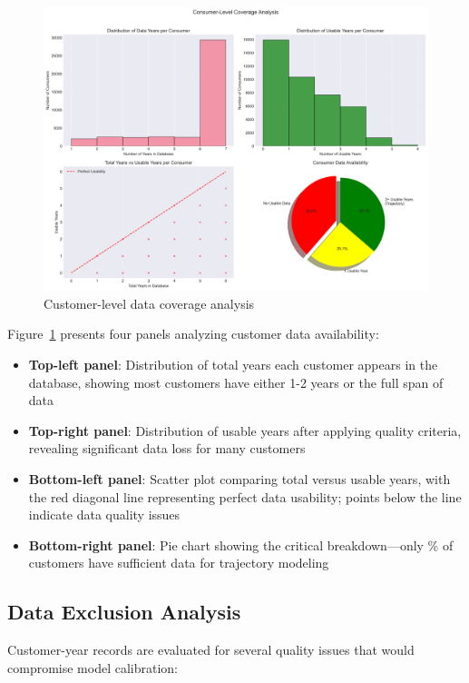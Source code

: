 \begin{figure}[h]
    \centering
    \includegraphics[width=\textwidth]{figures/consumer_coverage.png}
    \caption{Customer-level data coverage analysis}
    \label{fig:customer_coverage}
\end{figure}

Figure~\ref{fig:customer_coverage} presents four panels analyzing customer data availability:
\begin{itemize}
    \item \textbf{Top-left panel}: Distribution of total years each customer appears in the database, showing most customers have either 1-2 years or the full span of data
    \item \textbf{Top-right panel}: Distribution of usable years after applying quality criteria, revealing significant data loss for many customers
    \item \textbf{Bottom-left panel}: Scatter plot comparing total versus usable years, with the red diagonal line representing perfect data usability; points below the line indicate data quality issues
    \item \textbf{Bottom-right panel}: Pie chart showing the critical breakdown---only \CustomerPctTwoPlusYear\% of customers have sufficient data for trajectory modeling
\end{itemize}

\subsection{Data Exclusion Analysis}

Customer-year records are evaluated for several quality issues that would compromise model calibration:


